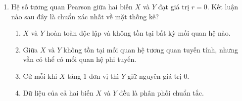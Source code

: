 \documentclass[11pt,a4paper]{article}
\begin{document}
\begin{enumerate}[leftmargin=*,itemsep=1.5pt]
\item Hệ số tương quan Pearson giữa hai biến $X$ và $Y$ đạt giá trị $r = 0$. Kết luận nào sau đây là chuẩn xác nhất về mặt thống kê?
\begin{enumerate}[label=\Alph*.]
  \item $X$ và $Y$ hoàn toàn độc lập và không tồn tại bất kỳ mối quan hệ nào.
  \item Giữa $X$ và $Y$ không tồn tại mối quan hệ tương quan tuyến tính, nhưng vẫn có thể có mối quan hệ phi tuyến.
  \item Cứ mỗi khi $X$ tăng 1 đơn vị thì $Y$ giữ nguyên giá trị 0.
  \item Dữ liệu của cả hai biến $X$ và $Y$ đều là phân phối chuẩn tắc.
\end{enumerate}

\end{enumerate}
\end{document}
